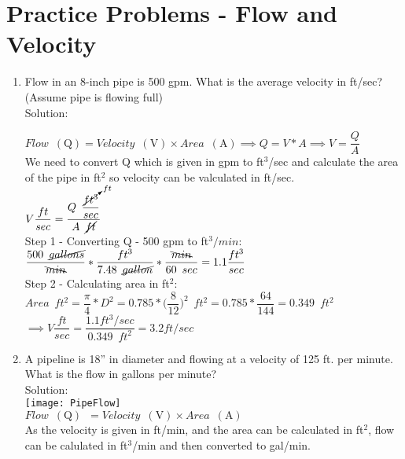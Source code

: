 \section*{Practice Problems - Flow and Velocity} 
\begin{enumerate}

\item Flow in an 8-inch pipe is 500 gpm. What is the average velocity in ft/sec? (Assume pipe is flowing full)\\
Solution:\\
\vspace{0.2cm}

$Flow \enspace(\mathrm{Q})= Velocity \enspace(\mathrm{V})  \times Area \enspace(\mathrm{A}) \implies Q=V*A \implies V=\dfrac{Q}{A}$\\
We need to convert Q which is given in gpm to ft${^3}$/sec and calculate the area of the pipe in ft${^2}$ so velocity can be valculated in ft/sec.\\
\vspace{0.2cm}
$ V \dfrac{ft}{sec} = \dfrac{Q \enspace \dfrac{\cancelto{ft}{ft^3}}{sec}}{A \enspace\cancel{ft}}$\\
\vspace{0.2cm}
Step 1 - Converting Q - 500 gpm to ft${^3}/min$:\\
\vspace{0.2cm}
$\dfrac{500 \enspace \cancel{gallons}}{\bcancel{min}}*\dfrac{ft^3}{7.48 \enspace \cancel{gallon}}*\dfrac{\bcancel{min}}{60 \enspace sec}=1.1\dfrac{ft^3}{sec}$\\
\vspace{0.2cm}
Step 2 - Calculating area in ft${^2}$:\\
\vspace{0.2cm}
$Area \enspace ft^2= \dfrac{\pi}{4}*D^2= 0.785*\Big(\dfrac{8}{12}\Big)^2 \enspace ft^2=0.785*\dfrac{64}{144}=0.349 \enspace ft^2$\\
\vspace{0.2cm}
$\implies V \dfrac{ft}{sec} = \dfrac{ 1.1 ft^3/sec}{0.349 \enspace ft^2} = \boxed{3.2 ft/sec}$\\
\vspace{0.3cm} 


\item A pipeline is 18” in diameter and flowing at a velocity of 125 ft. per minute. What is the flow in gallons per minute?\\
\vspace{0.2cm}
Solution:\\
\vspace{0.3cm}
\texttt{[image: PipeFlow]}\\
\vspace{0.3cm}
$Flow \enspace(\mathrm{Q}) \enspace = Velocity \enspace(\mathrm{V})  \times Area \enspace(\mathrm{A})$\\
\vspace{0.2cm}
As the velocity is given in ft/min, and the area can be calculated in ft$^2$, flow can be calulated in ft$^3$/min and then converted to gal/min.\\
\vspace{0.2cm}


\end{enumerate}
